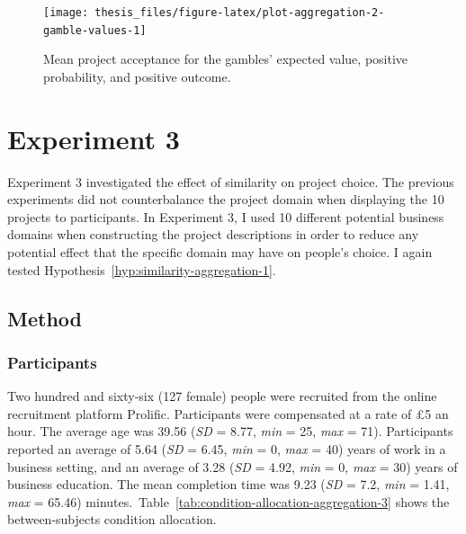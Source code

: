 \documentclass[a4paper, nobind, dvipsnames]{templates/ociamthesis}
\theoremstyle{definition}
\theoremstyle{definition}
\theoremstyle{definition}
\theoremstyle{definition}
\theoremstyle{remark}
\begin{document}
\begin{figure}
\texttt{[image: thesis\_files/figure-latex/plot-aggregation-2-gamble-values-1]} \caption{Mean project acceptance for the gambles' expected value, positive probability, and positive outcome.}\label{fig:plot-aggregation-2-gamble-values}
\end{figure}

\hypertarget{aggregation-3}{%
\section{Experiment 3}\label{aggregation-3}}

Experiment 3 investigated the effect of similarity on project choice. The
previous experiments did not counterbalance the project domain when displaying
the 10 projects to participants. In Experiment 3, I used 10 different potential
business domains when constructing the project descriptions in order to reduce
any potential effect that the specific domain may have on people's choice. I
again tested Hypothesis~\ref{hyp:similarity-aggregation-1}.

\hypertarget{method-8}{%
\subsection{Method}\label{method-8}}

\hypertarget{participants-7}{%
\subsubsection{Participants}\label{participants-7}}

Two hundred and sixty-six (127 female) people were recruited from the online recruitment platform Prolific. Participants were compensated at a rate of £5 an hour. The average age was 39.56 (\emph{SD} = 8.77, \emph{min} = 25, \emph{max} = 71). Participants reported an average of 5.64 (\emph{SD} = 6.45, \emph{min} = 0, \emph{max} = 40) years of work in a business setting, and an average of 3.28 (\emph{SD} = 4.92, \emph{min} = 0, \emph{max} = 30) years of business education. The mean completion time was 9.23 (\emph{SD} = 7.2, \emph{min} = 1.41, \emph{max} = 65.46) minutes.~Table~\ref{tab:condition-allocation-aggregation-3}
shows the between-subjects condition allocation.
\end{document}
